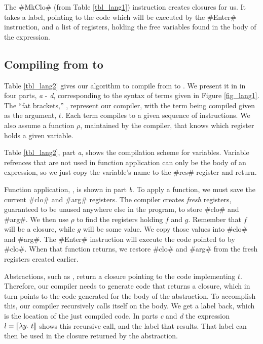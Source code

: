 \documentclass[12pt]{report}
\begin{document}
The #MkClo# (from Table \ref{tbl_lang1}) instruction creates closures
for us. It takes a label, pointing to the code which will be executed
by the #Enter# instruction, and a list of registers, holding the free
variables found in the body of the expression.

\subsection{Compiling from \lamA to \machLam}

Table \ref{tbl_lang2} gives our algorithm to compile from \lamA to
\machLam. We present it in in four parts, \emph{a} - \emph{d},
corresponding to the syntax of \lamA terms given in Figure
\ref{fig_lang1}. The ``fat brackets,'' , represent our
compiler, with the term being compiled given as the argument, $t$.
Each term compiles to a given sequence of instructions. We also assume
a function $\rho$, maintained by the compiler, that knows which
register holds a given variable.

\afterpage{\clearpage{}\clearpage}

Table \ref{tbl_lang2}, part \emph{a}, shows the compilation
scheme for variables. Variable refrences that are not used
in function application can only be the body of an expression, so we
just copy the variable's name to the #res#
register and return.

Function application, , is shown in part
\emph{b}. To apply a function, we must save the current #clo#
and #arg# registers. The compiler creates \emph{fresh} registers,
guaranteed to be unused anywhere else in the program, to store #clo#
and #arg#. We then use $\rho$ to find the registers holding $f$ and
$g$. Remember that $f$ will be a closure, while $g$ will be some
value. We copy those values into #clo# and #arg#. The #Enter#
instruction will execute the code pointed to by #clo#. When that
function returns, we restore #clo# and #arg# from the fresh registers
created earlier.

Abstractions, such as , return a closure pointing to the
code implementing $t$. Therefore, our compiler needs to generate code
that returns a closure, which in turn points to the code generated for
the body of the abstraction. To accomplish this, our compiler
recursively calls itself on the body. We get a label back, which is the
location of the just compiled code. In parts \emph{c} and \emph{d}
the expression $l = \llbracket \lambda y.\ t \rrbracket$ shows this
recursive call, and the label that results. That label can then be used in the 
closure returned by the abstraction.
\end{document}
